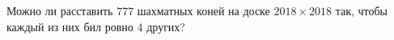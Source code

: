 Можно ли расставить $777$ шахматных коней на доске $2018 \times 2018$ так, чтобы каждый из них бил ровно $4$ других?
